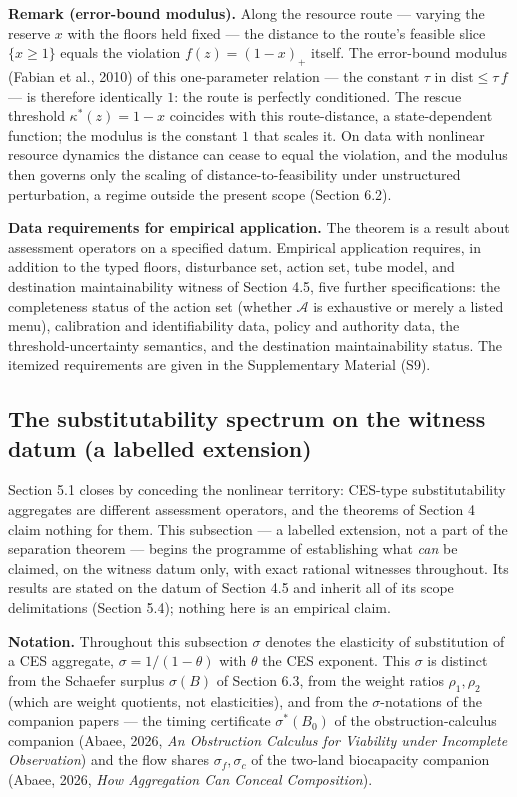 \documentclass[3p,11pt]{elsarticle}
\begin{document}
\textbf{Remark (error-bound modulus).} Along the resource route --- varying the reserve \(x\) with the floors held fixed --- the distance to the route's feasible slice \(\{x \ge 1\}\) equals the violation \(f(z) = (1 - x)_+\) itself. The error-bound modulus (Fabian et al., 2010) of this one-parameter relation --- the constant \(\tau\) in \(\mathrm{dist} \le \tau\, f\) --- is therefore identically \(1\): the route is perfectly conditioned. The rescue threshold \(\kappa^*(z) = 1 - x\) coincides with this route-distance, a state-dependent function; the modulus is the constant \(1\) that scales it. On data with nonlinear resource dynamics the distance can cease to equal the violation, and the modulus then governs only the scaling of distance-to-feasibility under unstructured perturbation, a regime outside the present scope (Section 6.2).

\textbf{Data requirements for empirical application.} The theorem is a
result about assessment operators on a specified datum. Empirical
application requires, in addition to the typed floors, disturbance set,
action set, tube model, and destination maintainability witness of
Section 4.5, five further specifications: the completeness status of the
action set (whether \(\mathcal{A}\) is exhaustive or merely a listed
menu), calibration and identifiability data, policy and authority data,
the threshold-uncertainty semantics, and the destination
maintainability status. The itemized requirements are given in the
Supplementary Material (S9).

\subsection{The substitutability spectrum on the witness datum (a
labelled extension)}\label{substitutability-spectrum}

Section 5.1 closes by conceding the nonlinear territory: CES-type
substitutability aggregates are different assessment operators, and the
theorems of Section 4 claim nothing for them. This subsection --- a
labelled extension, not a part of the separation theorem --- begins the
programme of establishing what \emph{can} be claimed, on the witness
datum only, with exact rational witnesses throughout. Its results are
stated on the datum of Section 4.5 and inherit all of its scope
delimitations (Section 5.4); nothing here is an empirical claim.

\textbf{Notation.} Throughout this subsection \(\sigma\) denotes the
elasticity of substitution of a CES aggregate, \(\sigma = 1/(1-\theta)\)
with \(\theta\) the CES exponent. This \(\sigma\) is distinct from
the Schaefer surplus \(\sigma(B)\) of Section 6.3, from the weight
ratios \(\rho_1, \rho_2\) (which are weight quotients, not
elasticities), and from the \(\sigma\)-notations of the companion
papers --- the timing certificate \(\sigma^*(B_0)\) of the
obstruction-calculus companion (Abaee, 2026, \emph{An Obstruction
Calculus for Viability under Incomplete Observation}) and the flow shares
\(\sigma_f, \sigma_c\) of the two-land biocapacity companion (Abaee,
2026, \emph{How Aggregation Can Conceal Composition}).
\end{document}
